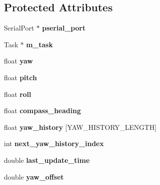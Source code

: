\subsection*{Protected Attributes}
\begin{DoxyCompactItemize}
\item 
\hypertarget{class_i_m_u_ae19d54a957992a40f0ee96abb63a6880}{}Serial\+Port $\ast$ {\bfseries pserial\+\_\+port}\label{class_i_m_u_ae19d54a957992a40f0ee96abb63a6880}

\item 
\hypertarget{class_i_m_u_a701a86c190578474fc8767fa653b0794}{}Task $\ast$ {\bfseries m\+\_\+task}\label{class_i_m_u_a701a86c190578474fc8767fa653b0794}

\item 
\hypertarget{class_i_m_u_abafcc13ad5e5bbe902188b5d15b83240}{}float {\bfseries yaw}\label{class_i_m_u_abafcc13ad5e5bbe902188b5d15b83240}

\item 
\hypertarget{class_i_m_u_afbeac482b873f4eabfc8f85009ce2c42}{}float {\bfseries pitch}\label{class_i_m_u_afbeac482b873f4eabfc8f85009ce2c42}

\item 
\hypertarget{class_i_m_u_acd6447159ca43d07412eedd0ae1ace58}{}float {\bfseries roll}\label{class_i_m_u_acd6447159ca43d07412eedd0ae1ace58}

\item 
\hypertarget{class_i_m_u_ab2505b0243397689c271de042a913536}{}float {\bfseries compass\+\_\+heading}\label{class_i_m_u_ab2505b0243397689c271de042a913536}

\item 
\hypertarget{class_i_m_u_aa37d4197ba9aaeb4644356e00f64640a}{}float {\bfseries yaw\+\_\+history} \mbox{[}Y\+A\+W\+\_\+\+H\+I\+S\+T\+O\+R\+Y\+\_\+\+L\+E\+N\+G\+T\+H\mbox{]}\label{class_i_m_u_aa37d4197ba9aaeb4644356e00f64640a}

\item 
\hypertarget{class_i_m_u_a39770f45709b018ab4caa1c7c7b950d9}{}int {\bfseries next\+\_\+yaw\+\_\+history\+\_\+index}\label{class_i_m_u_a39770f45709b018ab4caa1c7c7b950d9}

\item 
\hypertarget{class_i_m_u_af6e9bbef741b76157a0d7c4db722f525}{}double {\bfseries last\+\_\+update\+\_\+time}\label{class_i_m_u_af6e9bbef741b76157a0d7c4db722f525}

\item 
\hypertarget{class_i_m_u_aeed5a2a480ebd5dcad81192c39712ef4}{}double {\bfseries yaw\+\_\+offset}\label{class_i_m_u_aeed5a2a480ebd5dcad81192c39712ef4}


\end{DoxyCompactItemize}
